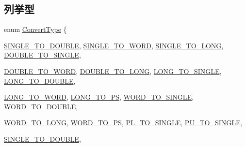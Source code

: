 \subsection*{列挙型}
\begin{DoxyCompactItemize}
\item 
enum \hyperlink{namespaceMipsISA_a3eb2ef7126c12e67d97d307c7aaa381d}{ConvertType} \{ \par
\hyperlink{namespaceMipsISA_a3eb2ef7126c12e67d97d307c7aaa381daa589dc496c4a7f6375b1d72eb4c7819f}{SINGLE\_\-TO\_\-DOUBLE}, 
\hyperlink{namespaceMipsISA_a3eb2ef7126c12e67d97d307c7aaa381da89fdb8efefb2aa91f56a83e7fda5d06e}{SINGLE\_\-TO\_\-WORD}, 
\hyperlink{namespaceMipsISA_a3eb2ef7126c12e67d97d307c7aaa381daab70f0a1659546fb3502da3d666ad3d6}{SINGLE\_\-TO\_\-LONG}, 
\hyperlink{namespaceMipsISA_a3eb2ef7126c12e67d97d307c7aaa381da809b874bf53fbd75995de5ea882e7d35}{DOUBLE\_\-TO\_\-SINGLE}, 
\par
\hyperlink{namespaceMipsISA_a3eb2ef7126c12e67d97d307c7aaa381dab0ac7a82a5700c458940d17816eb973b}{DOUBLE\_\-TO\_\-WORD}, 
\hyperlink{namespaceMipsISA_a3eb2ef7126c12e67d97d307c7aaa381da5e484ee7a59e7d6b054b12c742225665}{DOUBLE\_\-TO\_\-LONG}, 
\hyperlink{namespaceMipsISA_a3eb2ef7126c12e67d97d307c7aaa381da1deb8bbd76b01b2a0c68b23530ed2759}{LONG\_\-TO\_\-SINGLE}, 
\hyperlink{namespaceMipsISA_a3eb2ef7126c12e67d97d307c7aaa381da8f615b4003b99b6950e2cc48cf111c0f}{LONG\_\-TO\_\-DOUBLE}, 
\par
\hyperlink{namespaceMipsISA_a3eb2ef7126c12e67d97d307c7aaa381dae357946a1de8a0bbc7a82f1865768d8b}{LONG\_\-TO\_\-WORD}, 
\hyperlink{namespaceMipsISA_a3eb2ef7126c12e67d97d307c7aaa381da9551359c12029e5ae13eb7b83c948a0c}{LONG\_\-TO\_\-PS}, 
\hyperlink{namespaceMipsISA_a3eb2ef7126c12e67d97d307c7aaa381da8cc01247620be34987688d5c077e127f}{WORD\_\-TO\_\-SINGLE}, 
\hyperlink{namespaceMipsISA_a3eb2ef7126c12e67d97d307c7aaa381da8679fcc29997d3828b41aabf45575fe7}{WORD\_\-TO\_\-DOUBLE}, 
\par
\hyperlink{namespaceMipsISA_a3eb2ef7126c12e67d97d307c7aaa381da9aa0d2d62dcb8e62e0c284edb6893948}{WORD\_\-TO\_\-LONG}, 
\hyperlink{namespaceMipsISA_a3eb2ef7126c12e67d97d307c7aaa381daf532ef4dd1b95ed83ce611e6bbf24013}{WORD\_\-TO\_\-PS}, 
\hyperlink{namespaceMipsISA_a3eb2ef7126c12e67d97d307c7aaa381da9ae2e17dbe7603259fa4fe91fa26a5bd}{PL\_\-TO\_\-SINGLE}, 
\hyperlink{namespaceMipsISA_a3eb2ef7126c12e67d97d307c7aaa381da6352b1d55a1ed6f3abff04f0002f32a0}{PU\_\-TO\_\-SINGLE}, 
\par
\hyperlink{namespaceMipsISA_a3eb2ef7126c12e67d97d307c7aaa381daa589dc496c4a7f6375b1d72eb4c7819f}{SINGLE\_\-TO\_\-DOUBLE}, 

\end{DoxyCompactItemize}
